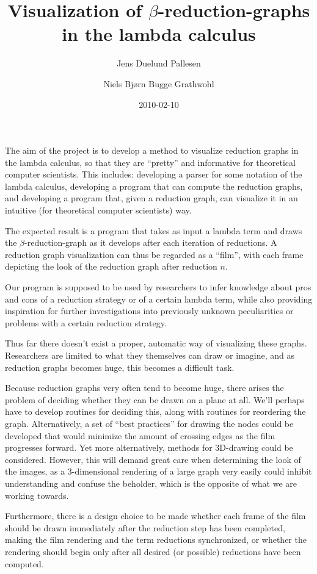 \documentclass[11pt,oneside,a4paper]{article}
\title{Visualization of $\beta$-reduction-graphs in the lambda calculus}
\author{Jens Duelund Pallesen \and
Niels Bjørn Bugge Grathwohl}
\date{2010-02-10}
\begin{document}
\maketitle


The aim of the project is to develop a method to visualize reduction graphs in
the lambda calculus, so that they are ``pretty'' and informative for theoretical
computer scientists. This includes: developing a parser for some notation of
the lambda calculus, developing a program that can compute the reduction
graphs, and developing a program that, given a reduction graph, can visualize
it in an intuitive (for theoretical computer scientists) way.


The expected result is a program that takes as input a lambda term and draws
the $\beta$-reduction-graph as it develops after each iteration of reductions.
A reduction graph visualization can thus be regarded as a ``film'', with each
frame depicting the look of the reduction graph after reduction $n$.


Our program is supposed to be used by researchers to infer knowledge about
pros and cons of a reduction strategy or of a certain lambda term, while also
providing inspiration for further investigations into previously unknown
peculiarities or problems with a certain reduction strategy.

Thus far there doesn't exist a proper, automatic way of visualizing these
graphs. Researchers are limited to what they themselves can draw or imagine,
and as reduction graphs becomes huge, this becomes a difficult task. 


Because reduction graphs very often tend to become huge, there arises the
problem of deciding whether they can be drawn on a plane at all. We'll perhaps
have to develop routines for deciding this, along with routines for reordering
the graph. Alternatively, a set of ``best practices'' for drawing the nodes
could be developed that would minimize the amount of crossing edges as the
film progresses forward. Yet more alternatively, methods for 3D-drawing could
be considered. However, this will demand great care when determining the look
of the images, as a 3-dimensional rendering of a large graph very easily could
inhibit understanding and confuse the beholder, which is the opposite of what
we are working towards.

Furthermore, there is a design choice to be made whether each frame of the
film should be drawn immediately after the reduction step has been completed,
making the film rendering and the term reductions synchronized, or whether the
rendering should begin only after all desired (or possible) reductions have
been computed.
\end{document}
